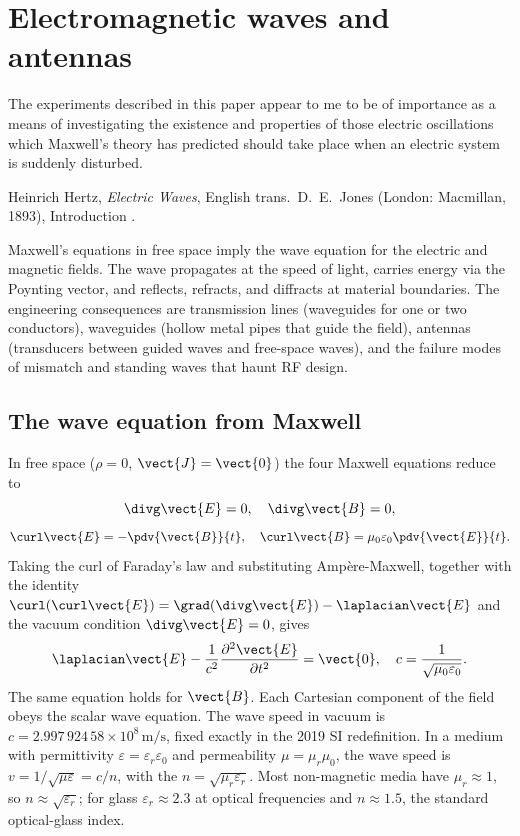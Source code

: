 \chapter{Electromagnetic waves and antennas}
\label{vol04:ch10}

\epigraph{The experiments described in this paper appear to me to be
of importance as a means of investigating the existence and properties
of those electric oscillations which Maxwell's theory has predicted
should take place when an electric system is suddenly disturbed.}
{Heinrich Hertz, \emph{Electric Waves}, English trans.\ D.\ E.\ Jones
(London: Macmillan, 1893), Introduction \cite[p.~1]{hist:hertz1893}.}


\noindent
Maxwell's equations in free space imply the wave equation for the
electric and magnetic fields. The wave propagates at the speed of
light, carries energy via the Poynting vector, and reflects, refracts,
and diffracts at material boundaries. The engineering consequences are
transmission lines (waveguides for one or two conductors), waveguides
(hollow metal pipes that guide the field), antennas (transducers
between guided waves and free-space waves), and the failure modes of
mismatch and standing waves that haunt RF design.

\section{The wave equation from Maxwell}

In free space ($\rho = 0$, $\vect{J} = \vect{0}$) the four Maxwell
equations reduce to
\[
\divg \vect{E} = 0, \quad \divg \vect{B} = 0,
\]
\[
\curl \vect{E} = -\pdv{\vect{B}}{t}, \quad \curl \vect{B} =
\mu_{0}\varepsilon_{0}\pdv{\vect{E}}{t}.
\]
Taking the curl of Faraday's law and substituting Amp\`ere-Maxwell,
together with the identity $\curl(\curl \vect{E}) = \grad(\divg
\vect{E}) - \laplacian \vect{E}$ and the vacuum condition
$\divg \vect{E} = 0$, gives
\[
\laplacian \vect{E} - \frac{1}{c^{2}}\frac{\partial^{2}\vect{E}}{
\partial t^{2}} = \vect{0}, \quad c = \frac{1}{\sqrt{\mu_{0}
\varepsilon_{0}}}.
\]
The same equation holds for $\vect{B}$. Each Cartesian component of
the field obeys the scalar wave equation. The wave speed in vacuum is
$c = 2.997\,924\,58\times 10^{8}\,\si{\meter\per\second}$, fixed
exactly in the 2019 SI redefinition. In a medium with permittivity
$\varepsilon = \varepsilon_{r}\varepsilon_{0}$ and permeability $\mu =
\mu_{r}\mu_{0}$, the wave speed is $v = 1/\sqrt{\mu \varepsilon} =
c/n$, with the  $n = \sqrt{\mu_{r}
\varepsilon_{r}}$. Most non-magnetic media have $\mu_{r}\approx 1$, so
$n\approx \sqrt{\varepsilon_{r}}$; for glass $\varepsilon_{r}\approx
2.3$ at optical frequencies and $n\approx 1.5$, the standard
optical-glass index.

